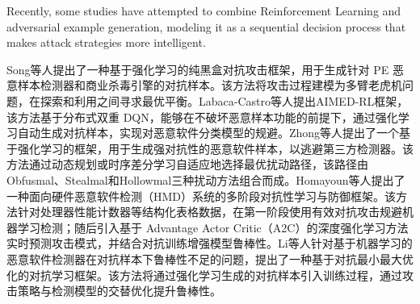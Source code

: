 Recently, some studies have attempted to combine Reinforcement Learning and adversarial example generation, modeling it as a sequential decision process that makes attack strategies more intelligent.

Song等人提出了一种基于强化学习的纯黑盒对抗攻击框架\cite{song2022mab}，用于生成针对 PE 恶意样本检测器和商业杀毒引擎的对抗样本。该方法将攻击过程建模为多臂老虎机问题，在探索和利用之间寻求最优平衡。Labaca-Castro等人提出AIMED-RL框架\cite{labaca2021aimed}，该方法基于分布式双重 DQN，能够在不破坏恶意样本功能的前提下，通过强化学习自动生成对抗样本，实现对恶意软件分类模型的规避。Zhong等人提出了一个基于强化学习的框架\cite{zhong2022reinforcement}，用于生成强对抗性的恶意软件样本，以逃避第三方检测器。该方法通过动态规划或时序差分学习自适应地选择最优扰动路径，该路径由Obfusmal、Stealmal和Hollowmal三种扰动方法组合而成。Homayoun等人提出了一种面向硬件恶意软件检测（HMD）系统的多阶段对抗性学习与防御框架\cite{he2024beyond}。该方法针对处理器性能计数器等结构化表格数据，在第一阶段使用有效对抗攻击规避机器学习检测；随后引入基于 Advantage Actor Critic（A2C）的深度强化学习方法实时预测攻击模式，并结合对抗训练增强模型鲁棒性。Li等人\cite{ebrahimi2022adversarial}针对基于机器学习的恶意软件检测器在对抗样本下鲁棒性不足的问题，提出了一种基于对抗最小最大优化的对抗学习框架。该方法将通过强化学习生成的对抗样本引入训练过程，通过攻击策略与检测模型的交替优化提升鲁棒性。

